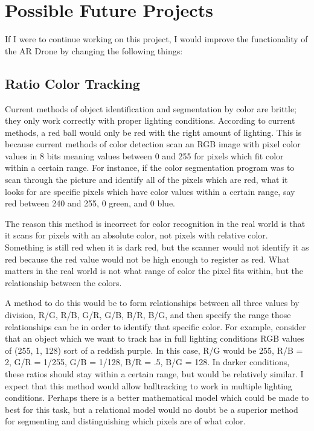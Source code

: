 \documentclass[a4paper,12pt]{report}
\begin{document}
\section{Possible Future Projects}
If I were to continue working on this project, I would improve the functionality of the AR Drone by changing the following things:
\subsection{Ratio Color Tracking}
  Current methods of object identification and segmentation by color are brittle; they only work correctly with proper lighting conditions. According to current methods, a red ball would only be red with the right amount of lighting. This is because current methods of color detection scan an RGB image with pixel color values in 8 bits meaning values between 0 and 255 for pixels which fit color within a certain range. For instance, if the color segmentation program was to scan through the picture and identify all of the pixels which are red, what it looks for are specific pixels which have color values within a certain range, say red between 240 and 255, 0 green, and 0 blue. 

The reason this method is incorrect for color recognition in the real world is that it scans for pixels with an absolute color, not pixels with relative color. Something is still red when it is dark red, but the scanner would not identify it as red because the red value would not be high enough to register as red. What matters in the real world is not what range of color the pixel fits within, but the relationship between the colors. 

A method to do this would be to form relationships between all three values by division, R/G, R/B, G/R, G/B, B/R, B/G, and then specify the range those relationships can be in order to identify that specific color. For example, consider that an object which we want to track has in full lighting conditions RGB values of (255, 1, 128) sort of a reddish purple. In this case, R/G would be 255, R/B = 2, G/R = 1/255, G/B = 1/128, B/R = .5, B/G = 128. In darker conditions, these ratios should stay within a certain range, but would be relatively similar. I expect that this method would allow balltracking to work in multiple lighting conditions. Perhaps there is a better mathematical model which could be made to best for this task, but a relational model would no doubt be a superior method for segmenting and distinguishing which pixels are of what color.
\end{document}
